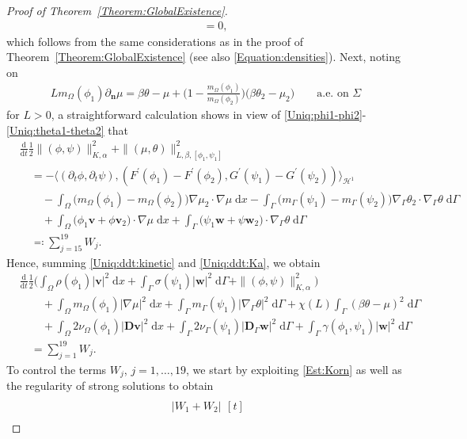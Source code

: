\documentclass[10pt,reqno]{amsart}
\theoremstyle{remark}
\numberwithin{equation}{section}
\newcommand{\abs}[1]{| #1 |}
\newcommand{\norm}[1]{\| #1 \|}
\newcommand{\n}{\mathbf{n}}
\newcommand{\bv}{\mathbf{v}}
\newcommand{\bw}{\mathbf{w}}
\newcommand{\D}{\mathbf{D}}
\newcommand{\Dg}{\mathbf{D}_\Gamma}
\newcommand{\intO}{\int_\Omega}
\newcommand{\intG}{\int_\Gamma}
\newcommand{\dx}{\;\mathrm{d}x}
\newcommand{\dG}{\;\mathrm d\Ga}
\newcommand{\ddt}{\frac{\mathrm d}{\mathrm dt}}
\newcommand{\delt}{\partial_{t}}
\newcommand{\deln}{\partial_\n}
\newcommand{\Grad}{\nabla}
\newcommand{\Gradg}{\nabla_\Ga}
\newcommand{\Om}{\Omega}
\newcommand{\Ga}{\Gamma}
\begin{document}
\begin{proof}[Proof of Theorem~\ref{Theorem:GlobalExistence}]
\begin{align*}
    &\quad = 0, \nonumber
\end{align*}
which follows from the same considerations as in the proof of Theorem~\ref{Theorem:GlobalExistence} (see also \eqref{Equation:densities}). Next, noting on
\begin{align*}
    Lm_\Om(\phi_1)\deln\mu = \beta\theta - \mu + \Big(1 - \frac{m_\Om(\phi_1)}{m_\Om(\phi_2)}\Big)\big(\beta\theta_2 - \mu_2) \qquad\text{a.e.~on~}\Sigma
\end{align*}
for $L > 0$, a straightforward calculation shows in view of \eqref{Uniq:phi1-phi2}-\eqref{Uniq:theta1-theta2} that
\begin{align}\label{Uniq:ddt:Ka}
    &\ddt\frac12\norm{(\phi,\psi)}_{K,\alpha}^2 + \norm{(\mu,\theta)}_{L,\beta,[\phi_1,\psi_1]}^2 \nonumber \\
    &\quad = - \big\langle (\delt\phi,\delt\psi), (F^\prime(\phi_1) - F^\prime(\phi_2),G^\prime(\psi_1) - G^\prime(\psi_2))\big\rangle_{\mathcal{H}^1} \nonumber \\
    &\qquad - \intO \big(m_\Om(\phi_1) - m_\Om(\phi_2)\big)\Grad\mu_2\cdot\Grad\mu\dx - \intG \big(m_\Ga(\psi_1) - m_\Ga(\psi_2)\big)\Gradg\theta_2\cdot\Gradg\theta\dG \\
    &\qquad + \intO \big(\phi_1\bv + \phi\bv_2\big)\cdot\Grad\mu\dx + \intG (\psi_1\bw + \psi\bw_2\big)\cdot\Gradg\theta\dG \nonumber \\
    &\quad\eqqcolon \sum_{j=15}^{19} W_j. \nonumber
\end{align}
Hence, summing \eqref{Uniq:ddt:kinetic} and \eqref{Uniq:ddt:Ka}, we obtain
\begin{align*}
    &\ddt\frac12\Big( \intO \rho(\phi_1)\abs{\bv}^2\dx + \intG\sigma(\psi_1)\abs{\bw}^2\dG + \norm{(\phi,\psi)}_{K,\alpha}^2 \Big) \\
    &\qquad + \intO m_\Om(\phi_1)\abs{\Grad\mu}^2\dx + \intG m_\Ga(\psi_1)\abs{\Gradg\theta}^2\dG + \chi(L)\intG (\beta\theta - \mu)^2\dG \\ 
    &\qquad +
    \intO 2\nu_\Om(\phi_1)\abs{\D\bv}^2\dx + \intG 2\nu_\Ga(\psi_1)\abs{\Dg\bw}^2\dG + \intG \gamma(\phi_1,\psi_1)\abs{\bw}^2\dG \\ 
    &\quad = \sum_{j=1}^{19} W_j.
\end{align*}
To control the terms $W_j$, $j=1,\ldots,19$, we start by exploiting \eqref{Est:Korn} as well as the regularity of strong solutions to obtain
\begin{align}
    \label{W12}
    \begin{split}
    &\abs{W_1 + W_2}
        \begin{aligned}[t]

\end{aligned}
\end{split}
\end{align}
\end{proof}
\end{document}

